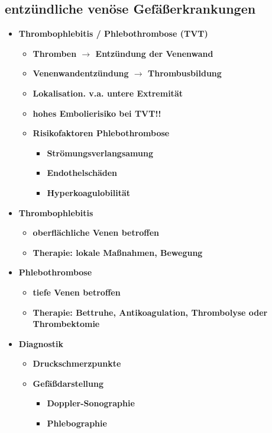 	\subsection*{entzündliche venöse Gefäßerkrankungen}
		\begin{itemize}
			\item \textbf{Thrombophlebitis / Phlebothrombose (TVT)}
				\begin{itemize}
					\item \textbf{Thromben $\rightarrow$ Entzündung der Venenwand}
					\item \textbf{Venenwandentzündung $\rightarrow$ Thrombusbildung}
					\item \textbf{Lokalisation. v.a. untere Extremität}
					\item \textbf{hohes Embolierisiko bei TVT!!}
					\item \textbf{Risikofaktoren Phlebothrombose}
						\begin{itemize}
							\item \textbf{Strömungsverlangsamung}
							\item \textbf{Endothelschäden}
							\item \textbf{Hyperkoagulobilität}
						\end{itemize}
				\end{itemize}
			\item \textbf{Thrombophlebitis}
				\begin{itemize}
					\item \textbf{oberflächliche Venen betroffen}
					\item \textbf{Therapie: lokale Maßnahmen, Bewegung}
				\end{itemize}
			\item \textbf{Phlebothrombose}
				\begin{itemize}
					\item \textbf{tiefe Venen betroffen}
					\item \textbf{Therapie: Bettruhe, Antikoagulation, Thrombolyse oder Thrombektomie}
				\end{itemize}
			\item \textbf{Diagnostik}
				\begin{itemize}
					\item \textbf{Druckschmerzpunkte}
					\item \textbf{Gefäßdarstellung}
						\begin{itemize}
							\item \textbf{Doppler-Sonographie}
							\item \textbf{Phlebographie}
						\end{itemize}
				\end{itemize}
		\end{itemize}
